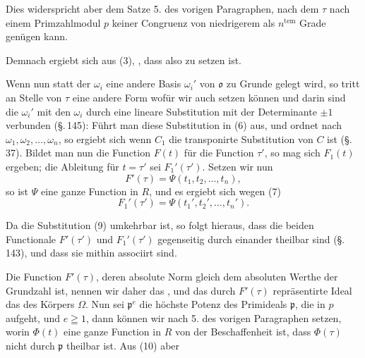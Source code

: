 
Dies widerspricht aber dem Satze 5. des vorigen Paragraphen, nach dem $\tau$ nach einem Primzahlmodul $p$ keiner Congruenz von niedrigerem als $n^{\mathrm{tem}}$ Grade genügen kann.

Demnach ergiebt sich aus (3), , dass also
zu setzen ist.

Wenn nun statt der $\omega_i$ eine andere Basis $\omega_i'$ von $\mathfrak{o}$ zu Grunde gelegt wird, so tritt an Stelle von $\tau$ eine andere Form
wofür wir auch setzen können
und darin sind die $\omega_i'$ mit den $\omega_i$ durch eine lineare Substitution mit der Determinante $\pm 1$ verbunden (\S.\,145):
Führt man diese Substitution in (6) aus, und ordnet nach $\omega_1, \omega_2, \ldots, \omega_n$, so ergiebt sich
wenn $C_1$ die transponirte Substitution von $C$ ist (\S.\,37). Bildet man nun die Function $F(t)$ für die Function $\tau'$, so mag sich $F_1(t)$ ergeben; die Ableitung für $t=\tau'$ sei $F_1'(\tau')$. Setzen wir nun
\[
F'(\tau) = \Psi(t_1, t_2, \ldots, t_n),
\]
so ist $\Psi$ eine ganze Function in $R$, und es ergiebt sich wegen (7)
\[
F_1'(\tau') = \Psi(t_1', t_2', \ldots, t_n').
\]

Da die Substitution (9) umkehrbar ist, so folgt hieraus, dass die beiden Functionale $F'(\tau')$ und $F_1'(\tau')$ gegenseitig durch einander theilbar sind (\S.\,143), und dass sie mithin associirt sind.

Die Function $F'(\tau)$, deren absolute Norm gleich dem absoluten Werthe der Grundzahl ist, nennen wir daher das , und das durch $F'(\tau)$ repräsentirte Ideal das  des Körpers $\Omega$. Nun sei $\mathfrak{p}^e$ die höchste Potenz des Primideals $\mathfrak{p}$, die in $p$ aufgeht, und $e \geqq 1$, dann können wir nach 5. des vorigen Paragraphen
setzen, worin $\Phi(t)$ eine ganze Function in $R$ von der Beschaffenheit ist, dass $\Phi(\tau)$ nicht durch $\mathfrak{p}$ theilbar ist. Aus (10) aber
